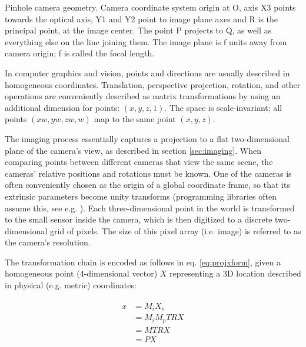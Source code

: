 {Pinhole camera geometry. Camera coordinate system origin at O, axis X3 points towards the optical axis, Y1 and Y2 point to image plane axes and R is the principal point, at the image center. The point P projects to Q, as well as everything else on the line joining them. The image plane is f units away from camera origin; f is called the focal length.}

In computer graphics and vision, points and directions are usually described in homogeneous coordinates.
Translation, perspective projection, rotation, and other operations are conveniently described as matrix transformations by using an additional dimension for points: $(x, y, z, 1)$.
The space is scale-invariant; all points $(xw, yw, zw, w)$ map to the same point $(x, y, z)$.
\cite{dubrofsky2009homography,hartley03multiview}


The imaging process essentially captures a projection to a flat two-dimensional plane of the camera's view, as described in section \ref{sec:imaging}.
When comparing points between different cameras that view the same scene, the cameras' relative positions and rotations must be known.
One of the cameras is often conveniently chosen as the origin of a global coordinate frame, so that its extrinsic parameters become unity transforms (programming libraries often assume this, see e.g. \cite{opencv}).
Each three-dimensional point in the world is transformed to the small sensor inside the camera, which is then digitized to a discrete two-dimensional grid of pixels. The size of this pixel array (i.e. image) is referred to as the camera's resolution.


The transformation chain is encoded as follows in eq. \ref{eq:projxform}, given a homogeneous point (4-dimensional vector) $X$ representing a 3D location described in physical (e.g. metric) coordinates:

\begin{align} \label{eq:projxform} \begin{split}
	x
	&= M_i X_s\\
	&= M_i M_p T R X\\
	&= M T R X\\
	&= P X\\
\end{split} \end{align}

